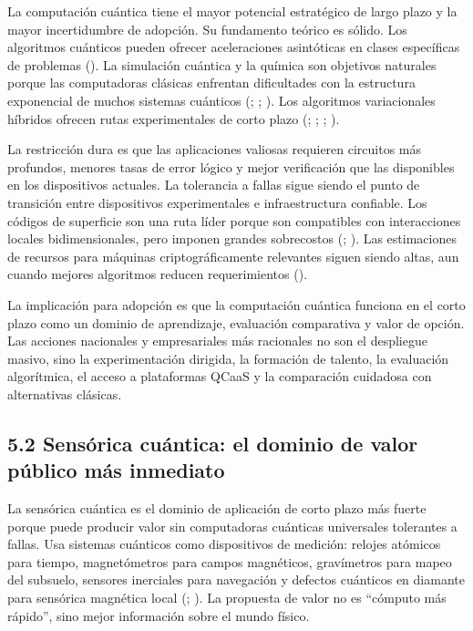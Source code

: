 \documentclass[
  11pt,
  letterpaper,
]{article}
\begin{document}
La computación cuántica tiene el mayor potencial estratégico de largo
plazo y la mayor incertidumbre de adopción. Su fundamento teórico es
sólido. Los algoritmos cuánticos pueden ofrecer aceleraciones
asintóticas en clases específicas de problemas
(). La simulación cuántica y
la química son objetivos naturales porque las computadoras clásicas
enfrentan dificultades con la estructura exponencial de muchos sistemas
cuánticos (;
; ). Los algoritmos variacionales híbridos ofrecen rutas
experimentales de corto plazo (; ;
;
).

La restricción dura es que las aplicaciones valiosas requieren circuitos
más profundos, menores tasas de error lógico y mejor verificación que
las disponibles en los dispositivos actuales. La tolerancia a fallas
sigue siendo el punto de transición entre dispositivos experimentales e
infraestructura confiable. Los códigos de superficie son una ruta líder
porque son compatibles con interacciones locales bidimensionales, pero
imponen grandes sobrecostos (; ).
Las estimaciones de recursos para máquinas criptográficamente relevantes
siguen siendo altas, aun cuando mejores algoritmos reducen
requerimientos ().

La implicación para adopción es que la computación cuántica funciona en
el corto plazo como un dominio de aprendizaje, evaluación comparativa y
valor de opción. Las acciones nacionales y empresariales más racionales
no son el despliegue masivo, sino la experimentación dirigida, la
formación de talento, la evaluación algorítmica, el acceso a plataformas
QCaaS y la comparación cuidadosa con alternativas clásicas.

\subsection{5.2 Sensórica cuántica: el dominio de valor público más
inmediato}\label{sensuxf3rica-cuuxe1ntica-el-dominio-de-valor-puxfablico-muxe1s-inmediato}

La sensórica cuántica es el dominio de aplicación de corto plazo más
fuerte porque puede producir valor sin computadoras cuánticas
universales tolerantes a fallas. Usa sistemas cuánticos como
dispositivos de medición: relojes atómicos para tiempo, magnetómetros
para campos magnéticos, gravímetros para mapeo del subsuelo, sensores
inerciales para navegación y defectos cuánticos en diamante para
sensórica magnética local (; ). La
propuesta de valor no es ``cómputo más rápido'', sino mejor información
sobre el mundo físico.
\end{document}
